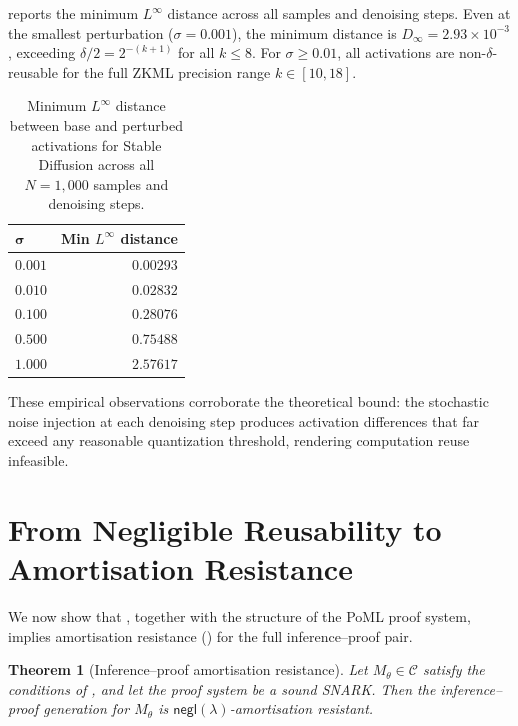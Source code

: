 \documentclass[11pt]{article}
\newtheorem{theorem}{Theorem}[section]
\newcommand{\negl}{\mathsf{negl}}
\newcommand{\calC}{\mathcal{C}}
\begin{document}
 reports the minimum $L^\infty$ distance across all samples and denoising steps.  Even at the smallest perturbation ($\sigma = 0.001$), the minimum distance is $D_\infty = 2.93 \times 10^{-3}$, exceeding $\delta/2 = 2^{-(k+1)}$ for all $k \leq 8$.  For $\sigma \geq 0.01$, all activations are non-$\delta$-reusable for the full ZKML precision range $k \in [10, 18]$.

\begin{table}[t]
  \centering
  \caption{Minimum $L^\infty$ distance between base and perturbed activations for Stable Diffusion across all $N = 1{,}000$ samples and denoising steps.}
  \label{tab:min-linf}
  \begin{tabular}{lr}
    \toprule
    $\boldsymbol{\sigma}$ & \textbf{Min $L^\infty$ distance} \\
    \midrule
    $0.001$ & $0.00293$ \\
    $0.010$ & $0.02832$ \\
    $0.100$ & $0.28076$ \\
    $0.500$ & $0.75488$ \\
    $1.000$ & $2.57617$ \\
    \bottomrule
  \end{tabular}
\end{table}

These empirical observations corroborate the theoretical bound: the stochastic noise injection at each denoising step produces activation differences that far exceed any reasonable quantization threshold, rendering computation reuse infeasible.
\section{From Negligible Reusability to Amortisation Resistance}
\label{sec:full-argument}

We now show that , together with the structure of the PoML proof system, implies amortisation resistance () for the full inference--proof pair.

\begin{theorem}[Inference--proof amortisation resistance]
\label{thm:combined}
Let $M_\theta \in \calC$ satisfy the conditions of , and let the proof system be a sound SNARK. Then the inference--proof generation for $M_\theta$ is $\negl(\lambda)$-amortisation resistant.
\end{theorem}
\end{document}
